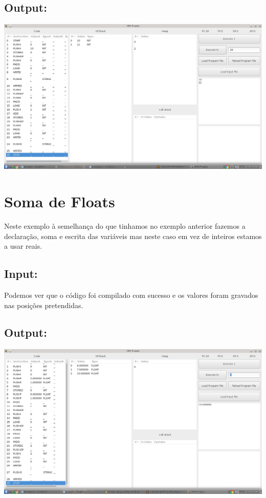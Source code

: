 \documentclass{report}
\begin{document}
\subsection{Output:}

\includegraphics[width=\linewidth]{BasicINT.jpg}

\section{Soma de Floats}
Neste exemplo à semelhança do que tinhamos no exemplo anterior fazemos a declaração, soma e escrita das variáveis mas neste caso em vez de inteiros estamos a usar reais.
\subsection{Input:}
Podemos ver que o código foi compilado com sucesso e os valores foram gravados nas posições pretendidas.
\subsection{Output:}

\includegraphics[width=\linewidth]{BasicFLOAT.jpg}
\end{document}
